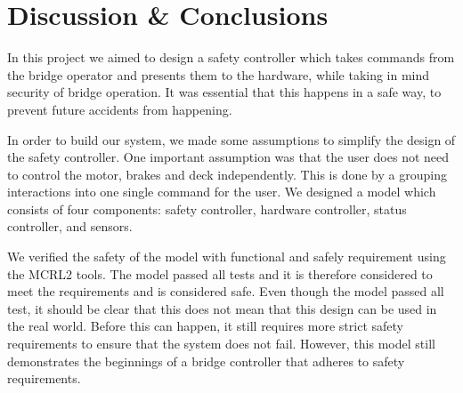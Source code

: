 \chapter{Discussion \& Conclusions}	\label{chap: conclusion}
	In this project we aimed to design a safety controller which takes commands from the bridge operator 
	and presents them to the hardware, while taking in mind security of bridge operation.
	It was essential that this happens in a safe way, to prevent future accidents from happening.
	
	In order to build our system, we made some assumptions to simplify the design of the safety controller.
	One important assumption was that the user does not need to control the motor,
	brakes and deck independently. %
	This is done by a grouping interactions into one single command for the user.
	We designed a model which consists of four components: safety controller, hardware controller, status controller, and sensors.  
	
	We verified the safety of the model with functional and safely requirement using the MCRL2 tools.
	The model passed all tests and it is therefore considered to meet the requirements and is considered safe.
	Even though the model passed all test, it should be clear that this does not mean that this design can be used in the real world.
	Before this can happen, it still requires more strict safety requirements to ensure that the system does not fail.
	However, this model still demonstrates the beginnings of a bridge controller that adheres to safety requirements. 
